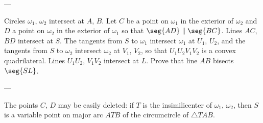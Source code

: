 
---

Circles $\omega_1$, $\omega_2$ intersect at $A$, $B$. Let $C$ be a point on $\omega_1$ in the exterior of $\omega_2$ and $D$ a point on $\omega_2$ in the exterior of $\omega_1$ so that $\seg{AD}\parallel\seg{BC}$. Lines $AC$, $BD$ intersect at $S$. The tangents from $S$ to $\omega_1$ intersect $\omega_1$ at $U_1$, $U_2$, and the tangents from $S$ to $\omega_2$ intersect $\omega_2$ at $V_1$, $V_2$, so that $U_1U_2V_1V_2$ is a convex quadrilateral. Lines $U_1U_2$, $V_1V_2$ intersect at $L$. Prove that line $AB$ bisects $\seg{SL}$.

---

The points $C$, $D$ may be easily deleted: if $T$ is the insimilicenter of $\omega_1$, $\omega_2$, then $S$ is a variable point on major arc $ATB$ of the circumcircle of $\triangle TAB$.

